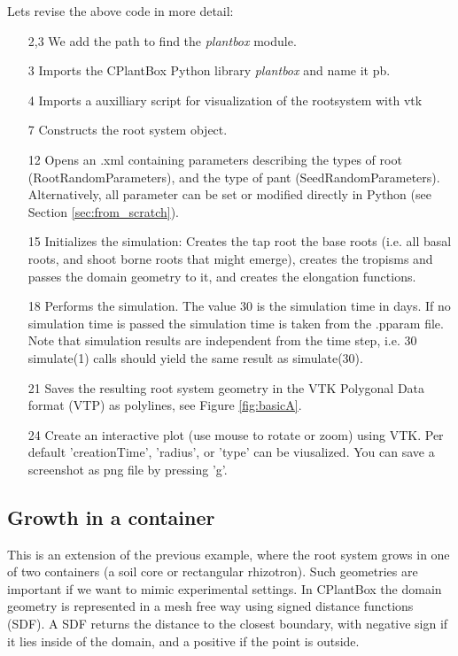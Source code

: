 \noindent 
Lets revise the above code in more detail: 
\begin{itemize}
 \item[2,3] We add the path to find the \emph{plantbox} module.
 \item[3] Imports the CPlantBox Python library \emph{plantbox} and name it pb.
 \item[4] Imports a auxilliary script for visualization of the rootsystem with vtk
 \item[7] Constructs the root system object.
 \item[12] Opens an .xml containing parameters describing the types of root (RootRandomParameters), 
 and the type of pant (SeedRandomParameters). Alternatively, all parameter can be set or modified directly in Python 
 (see Section \ref{sec:from_scratch}).
 \item[15] Initializes the simulation: Creates the tap root the base roots 
 (i.e. all basal roots, and shoot borne roots that might emerge), creates the tropisms and passes the domain geometry to it, 
 and creates the elongation functions. 
 \item[18] Performs the simulation. The value 30 is the simulation time in days. 
 If no simulation time is passed the simulation time is taken from the .pparam file. 
 Note that simulation results are independent from the time step, i.e. 30 simulate(1) calls should yield the same result 
 as simulate(30). 
 \item[21] Saves the resulting root system geometry in the VTK Polygonal Data format (VTP) as polylines, 
 see Figure \ref{fig:basicA}. 
 \item[24] Create an interactive plot (use mouse to rotate or zoom) using VTK. 
 Per default 'creationTime', 'radius', or 'type' can be viusalized.
 You can save a screenshot as png file by pressing 'g'.
 \end{itemize}
  
\subsection{Growth in a container}

This is an extension of the previous example, where the root system grows in one of two containers 
(a soil core or rectangular rhizotron). Such geometries are important if we want to mimic experimental settings. 
In CPlantBox the domain geometry is represented in a mesh free way using signed distance functions (SDF). 
A SDF returns the distance to the closest boundary, with negative sign if it lies inside of the domain, 
and a positive if the point is outside.

